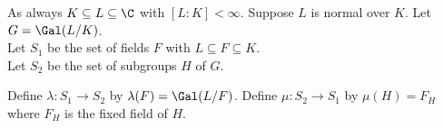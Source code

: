 As always $K\subseteq L\subseteq\C$ with $[L:K]<\infty$.  Suppose $L$ is normal over $K$.  Let $G=\Gal(L/K)$. \\
Let $S_1$ be the set of fields $F$ with $L\subseteq F\subseteq K$. \\
Let $S_2$ be the set of subgroups $H$ of $G$.

Define $\lambda\colon S_1\to S_2$ by $\lambda(F)=\Gal(L/F)$.  Define $\mu\colon S_2\to S_1$ by $\mu(H)=F_H$ where $F_H$ is the fixed field of $H$.